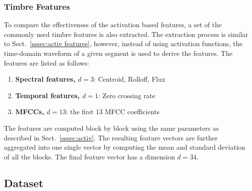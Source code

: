 \documentclass{article}
\begin{document}
{{{{{{{\subsubsection{Timbre Features}
\label{sssec:timbre features}
To compare the effectiveness of the activation based features, a set of the commonly used timbre features is also extracted. The extraction process is similar to Sect.~\ref{sssec:activ features}, however, instead of using activation functions, the time-domain waveform of a given segment is used to derive the features. The features are listed as follows: 

\begin{enumerate}
	\item \textbf{Spectral features, $d = 3$}: Centroid, Rolloff, Flux
	\item \textbf{Temporal features, $d = 1$}: Zero crossing rate
	\item \textbf{MFCCs, $d = 13$}: the first 13 MFCC coefficients
\end{enumerate}

The features are computed block by block using the same parameters as described in Sect.~\ref{sssec:activ}. The resulting feature vectors are further aggregated into one single vector by computing the mean and standard deviation of all the blocks. The final feature vector has a dimension $d = 34$. 

%

\subsection{Dataset}
}}}}}}}
\end{document}
